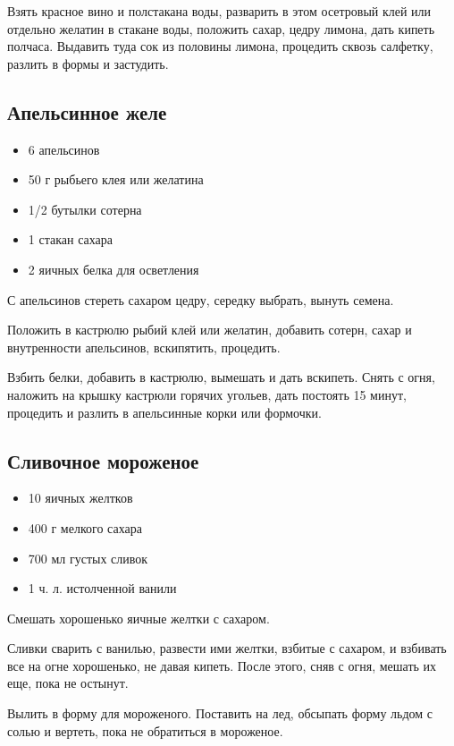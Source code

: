 Взять красное вино и полстакана воды, разварить в этом осетровый клей или отдельно желатин в стакане воды, положить сахар, цедру лимона, дать кипеть полчаса. Выдавить туда сок из половины лимона, процедить сквозь салфетку, разлить в формы и застудить.

\subsection{Апельсинное желе}

\begin{itemize}
	\item 6 апельсинов 
    \item 50 г рыбьего клея или желатина 
    \item 1/2 бутылки сотерна
    \item 1 стакан сахара 
    \item 2 яичных белка для осветления
\end{itemize}

С апельсинов стереть сахаром цедру, середку выбрать, вынуть семена.

Положить в кастрюлю рыбий клей или желатин, добавить сотерн, сахар и внутренности апельсинов, вскипятить, процедить.

Взбить белки, добавить в кастрюлю, вымешать и дать вскипеть. Снять с огня, наложить на крышку кастрюли горячих угольев, дать постоять 15 минут, процедить и разлить в апельсинные корки или формочки.

\subsection{Сливочное мороженое}

\begin{itemize}
	\item 10 яичных желтков
    \item 400 г мелкого сахара 
    \item 700 мл густых сливок
    \item 1 ч. л. истолченной ванили
\end{itemize}

Смешать хорошенько яичные желтки с сахаром.

Сливки сварить с ванилью, развести ими желтки, взбитые с сахаром, и взбивать все на огне хорошенько, не давая кипеть. После этого, сняв с огня, мешать их еще, пока не остынут.

Вылить в форму для мороженого. Поставить на лед, обсыпать форму льдом с солью и вертеть, пока не обратиться в мороженое.

